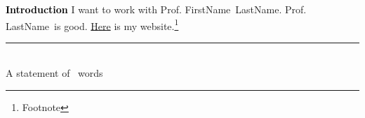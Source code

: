 \documentclass[12pt]{article}
\newcommand{\statement}[1]{\medskip\noindent
  \textcolor{black}{\textbf{#1}}\space
}
\let\oldcenter\center
\let\oldendcenter\endcenter
\renewenvironment{center}{\setlength\topsep{0pt}\oldcenter}{\oldendcenter}
\newcommand{\wordcount}{
\begin{center}
\rule{0.75\textwidth}{.4pt}\\
{\footnotesize A statement of \numwords \ words}
\end{center}
}
\newif\ifcomments
\newcommand{\todo}[1]{\ifcomments\textcolor{red}{TODO: #1}\fi}
\newcommand{\advisorfirstname}{FirstName}
\newcommand{\advisorlastname}{LastName}
\newcommand{\advisorfull}{Prof. \advisorfirstname \ \advisorlastname}
\newcommand{\advisor}{Prof. \advisorlastname}
\newcommand{\numwords}{\todo{number}}
\begin{document}
\statement{Introduction} I want to work with \advisorfull. \advisor \ is good. \href{https://www.google.com}{Here} is my website.\footnote{Footnote}
\wordcount
\end{document}
